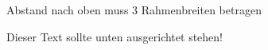\documentclass[a3paper,13pt,rgb]{tubsposter}
\begin{document}
\begin{gausspage}[designhelper,sender=top]%
  \showtubslogo[right]
  
  \begin{segment}[bgimage=infozentrum.jpg]{3}
     Abstand nach oben muss 3 Rahmenbreiten betragen
  \end{segment}
  \begin{segment}[bgcolor=tuViolet,fgcolor=tuWhite]{2}
    \lipsum[2]
  \end{segment}
  \begin{segment}[b,bgcolor=tuGreenLight]{3}
    Dieser Text sollte unten ausgerichtet stehen!
  \end{segment}
\end{gausspage}
\end{document}
